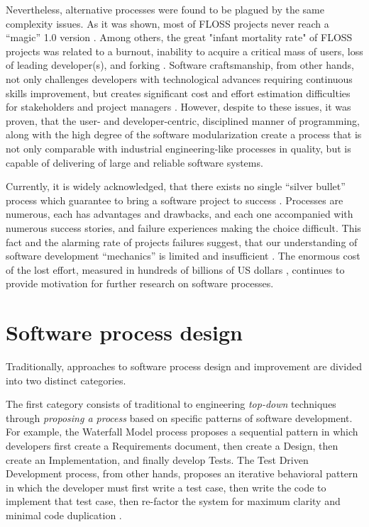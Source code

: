 Nevertheless, alternative processes were found to be plagued by the same complexity issues. 
As it was shown, most of FLOSS projects never reach a ``magic'' 1.0 version \cite{citeulike:12480029}. 
Among others, the great "infant mortality rate" of FLOSS projects was related to a burnout, 
inability to acquire a critical mass of users, loss of leading developer(s), and forking \cite{richter2007critique}. 
Software craftsmanship, from other hands, not only challenges developers with technological advances 
requiring continuous skills improvement, but creates significant cost and effort estimation difficulties for
stakeholders and project managers \cite{citeulike:11058784}. However, despite to these issues, 
it was proven, that the user- and developer-centric, disciplined manner of programming, along with the high 
degree of the software modularization create a process that is not only comparable with industrial 
engineering-like processes in quality, but is capable of delivering of large and reliable software systems.

Currently, it is widely acknowledged, that there exists no single ``silver bullet'' process which 
guarantee to bring a software project to success \cite{citeulike:1986013}. 
Processes are numerous, each has advantages and drawbacks, and each one accompanied with 
numerous success stories, and failure experiences making the choice difficult. 
This fact and the alarming rate of projects failures suggest, that our understanding of software 
development ``mechanics''  is limited and insufficient \cite{citeulike:12550665}. 
The enormous cost of the lost effort, measured in hundreds of billions of US dollars 
\cite{citeulike:2207657} \cite{citeulike:2207653} \cite{citeulike:2207655}, 
continues to provide motivation for further research on software processes. 

%
%
\section{Software process design}\label{section_software_process_design}
Traditionally, approaches to software process design and improvement are divided into two distinct categories. 

The first category consists of traditional to engineering \textit{top-down} techniques through 
\textit{proposing a process} based on specific patterns of software development. 
For example, the Waterfall Model process proposes a sequential pattern in which developers first create a 
Requirements document, then create a Design, then create an Implementation, and finally develop Tests. 
The Test Driven Development process, from other hands, proposes an iterative behavioral pattern in which
the developer must first write a test case, then write the code to implement that test case, then re-factor the 
system for maximum clarity and minimal code duplication \cite{citeulike:6086365}. 


